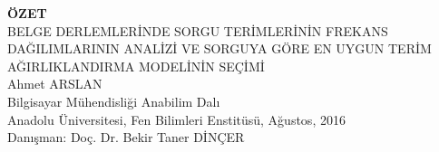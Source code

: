 %
%
%

\newpage
\begin{spacing}{1.1}
\begin{center}
\textbf{\"{O}ZET} \vspace{4mm}\\
BELGE DERLEMLER\.{I}NDE SORGU TER\.{I}MLER\.{I}N\.{I}N FREKANS DA\u{G}ILIMLARININ ANAL\.{I}Z\.{I} VE SORGUYA G\"{O}RE EN UYGUN TER\.{I}M A\u{G}IRLIKLANDIRMA MODEL\.{I}N\.{I}N SE\c{C}\.{I}M\.{I}\\
\vspace{4mm}
Ahmet ARSLAN
\vspace{4mm} \\
Bilgisayar M\"{u}hendisli\u{g}i Anabilim Dal{\i} \\
Anadolu \"{U}niversitesi, Fen Bilimleri Enstit\"{u}s\"{u}, A\u{g}ustos, 2016 \\
\vspace{4mm}
Dan{\i}\c{s}man: Do\c{c}. Dr. Bekir Taner D\.{I}N\c{C}ER \\
\end{center}
\vspace*{-1mm}



\end{spacing}
